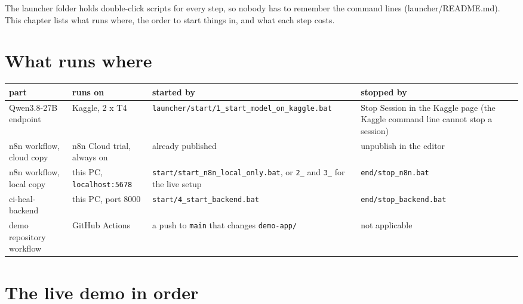 \documentclass[11pt,a4paper]{report}
\begin{document}
The launcher folder holds double-click scripts for every step, so nobody has to remember the command lines (launcher/README.md). This chapter lists what runs where, the order to start things in, and what each step costs.

\section{What runs where}

\begin{longtable}{>{\raggedright\arraybackslash}p{0.141\dimexpr\linewidth-8\tabcolsep\relax}>{\raggedright\arraybackslash}p{0.153\dimexpr\linewidth-8\tabcolsep\relax}>{\raggedright\arraybackslash}p{0.353\dimexpr\linewidth-8\tabcolsep\relax}>{\raggedright\arraybackslash}p{0.353\dimexpr\linewidth-8\tabcolsep\relax}}
\toprule
\textbf{part} & \textbf{runs on} & \textbf{started by} & \textbf{stopped by} \\
\midrule
\endhead
Qwen3.8-27B endpoint & Kaggle, 2 x T4 & \texttt{launcher/\allowbreak{}start/\allowbreak{}1\_\allowbreak{}start\_\allowbreak{}model\_\allowbreak{}on\_\allowbreak{}kaggle.\allowbreak{}bat} & Stop Session in the Kaggle page (the Kaggle command line cannot stop a session) \\
n8n workflow, cloud copy & n8n Cloud trial, always on & already published & unpublish in the editor \\
n8n workflow, local copy & this PC, \texttt{localhost:5678} & \texttt{start/\allowbreak{}start\_\allowbreak{}n8n\_\allowbreak{}local\_\allowbreak{}only.\allowbreak{}bat}, or \texttt{2\_\allowbreak{}} and \texttt{3\_\allowbreak{}} for the live setup & \texttt{end/\allowbreak{}stop\_\allowbreak{}n8n.\allowbreak{}bat} \\
ci-heal-backend & this PC, port 8000 & \texttt{start/\allowbreak{}4\_\allowbreak{}start\_\allowbreak{}backend.\allowbreak{}bat} & \texttt{end/\allowbreak{}stop\_\allowbreak{}backend.\allowbreak{}bat} \\
demo repository workflow & GitHub Actions & a push to \texttt{main} that changes \texttt{demo-\allowbreak{}app/\allowbreak{}} & not applicable \\
\bottomrule
\end{longtable}

\section{The live demo in order}
\end{document}
